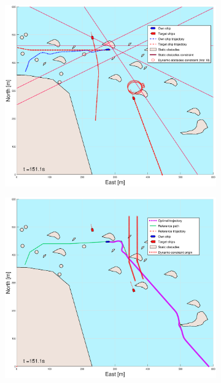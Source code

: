 \begin{figure}[ht]
\begin{subfigure}[b]{0.499\textwidth}
    \end{subfigure}
    \hfill
    \\ 
    \begin{subfigure}[b]{0.49\textwidth}
        \centering
        \includegraphics[width=\textwidth]{Images/Figures/skjergard_m_trafikk_NEW/_Simple_0fig1_time=151}
    \end{subfigure}
    \hfill
    \begin{subfigure}[b]{0.499\textwidth}
        \centering
        \includegraphics[width=\textwidth]{Images/Figures/skjergard_m_trafikk_NEW/_Simple_0fig999_time=151}
    \end{subfigure}
    \hfill
\end{figure}
